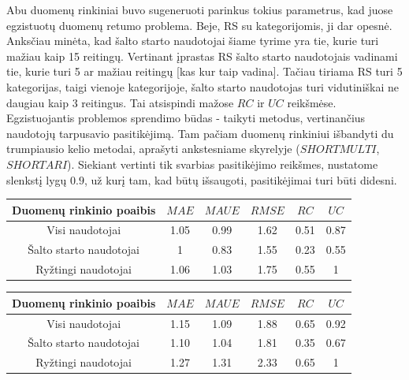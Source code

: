 \documentclass{VUMIFInfMagistrinis}
\begin{document}
\indent
Abu duomenų rinkiniai buvo sugeneruoti parinkus tokius parametrus, kad juose egzistuotų duomenų retumo problema. Beje, RS su kategorijomis, ji dar opesnė. Anksčiau minėta, kad šalto starto naudotojai šiame tyrime yra tie, kurie turi mažiau kaip 15 reitingų. Vertinant įprastas RS šalto starto naudotojais vadinami tie, kurie turi 5 ar mažiau reitingų [kas kur taip vadina]. Tačiau tiriama RS turi 5 kategorijas, taigi vienoje kategorijoje, šalto starto naudotojas turi vidutiniškai ne daugiau kaip 3 reitingus. Tai atsispindi mažose $RC$ ir $UC$ reikšmėse. Egzistuojantis problemos sprendimo būdas - taikyti metodus, vertinančius naudotojų tarpusavio pasitikėjimą. Tam pačiam duomenų rinkiniui išbandyti du trumpiausio kelio metodai, aprašyti ankstesniame skyrelyje ($SHORTMULTI$, $SHORTARI$). Siekiant vertinti tik svarbias pasitikėjimo reikšmes, nustatome slenkstį lygų $0.9$, už kurį tam, kad būtų išsaugoti, pasitikėjimai turi būti didesni.
\begin{center}
	\begin{tabular}{||c c c c c c||} 
		Duomenų rinkinio poaibis & $MAE$ & $MAUE$ & $RMSE$ & $RC$ & $UC$ \\
		\hline
		Visi naudotojai & 1.05 & 0.99 & 1.62 & 0.51 & 0.87 \\
		\hline
		Šalto starto naudotojai & 1 & 0.83 & 1.55 & 0.23 & 0.55 \\
		\hline
		Ryžtingi naudotojai & 1.06 & 1.03 & 1.75 & 0.55 & 1 \\
	\end{tabular}
\end{center}

\begin{center}
	\begin{tabular}{||c c c c c c||} 
		Duomenų rinkinio poaibis & $MAE$ & $MAUE$ & $RMSE$ & $RC$ & $UC$ \\
		\hline
		Visi naudotojai & 1.15 & 1.09 & 1.88 & 0.65 & 0.92 \\
		\hline
		Šalto starto naudotojai & 1.10 & 1.04 & 1.81 & 0.35 & 0.67 \\
		\hline
		Ryžtingi naudotojai & 1.27 & 1.31 & 2.33 & 0.65 & 1 \\
	\end{tabular}
	
\end{center}
\end{document}
